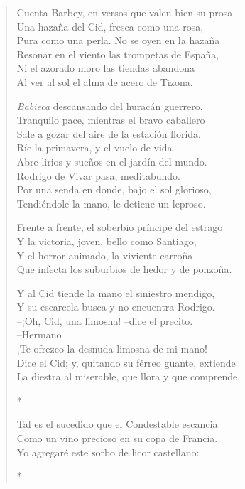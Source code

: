 \documentclass[12pt]{article}
\begin{document}
\clearpage
{}
\begin{verse}

Cuenta Barbey, en versos que valen bien su prosa\\
Una hazaña del Cid, fresca como una rosa,\\
Pura como una perla. No se oyen en la hazaña\\
Resonar en el viento las trompetas de España,\\
Ni el azorado moro las tiendas abandona\\
Al ver al sol el alma de acero de Tizona.  

\emph{Babieca} descansando del huracán guerrero,\\
Tranquilo pace, mientras el bravo caballero\\
Sale a gozar del aire de la estación florida.\\
Ríe la primavera, y el vuelo de vida\\
Abre lirios y sueños en el jardín del mundo.\\
Rodrigo de Vivar pasa, meditabundo.\\
Por una senda en donde, bajo el sol glorioso,\\
Tendiéndole la mano, le detiene un leproso.  

Frente a frente, el soberbio príncipe del estrago\\
Y la victoria, joven, bello como Santiago,\\
Y el horror animado, la viviente carroña\\
Que infecta los suburbios de hedor y de ponzoña.  

Y al Cid tiende la mano el siniestro mendigo,\\
Y su escarcela busca y no encuentra Rodrigo.\\
--¡Oh, Cid, una limosna! --dice el precito.\\
--Hermano\\
¡Te ofrezco la desnuda limosna de mi mano!--\\
Dice el Cid; y, quitando su férreo guante, extiende\\
La diestra al miserable, que llora y que comprende.  

*  

Tal es el sucedido que el Condestable escancia\\
Como un vino precioso en su copa de Francia.\\
Yo agregaré este sorbo de licor castellano:  

*  


\end{verse}
\end{document}
